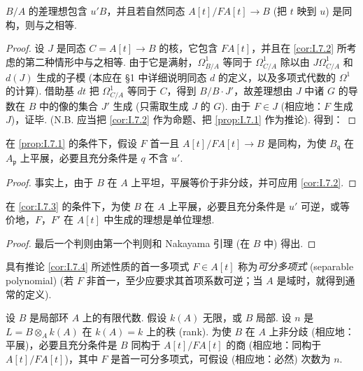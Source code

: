 \begin{corollary}\label{cor:I.7.2}
$B/A$ 的差理想包含 $u'B$，并且若自然同态 $A[t]/FA[t] \to B$ (把 $t$ 映到 $u$) 是同构，则与之相等.
\end{corollary}

\begin{proof}
设 $J$ 是同态 $C = A[t] \to B$ 的核，它包含 $FA[t]$，并且在 \ref{cor:I.7.2} 所考虑的第二种情形中与之相等. 由于它是满射，$\varOmega_{B/A}^{1}$ 等同于 $\varOmega_{C/A}^{1}$ 除以由 $J\varOmega_{C/A}^{1}$ 和 $d(J)$ 生成的子模 (本应在 §1 中详细说明同态 $d$ 的定义，以及多项式代数的 $\varOmega^{1}$ 的计算). 借助基 $dt$ 把 $\varOmega_{C/A}^{1}$ 等同于 $C$，得到 $B / B \cdot J'$，故差理想由 $J$ 中诸 $G$ 的导数在 $B$ 中的像的集合 $J'$ 生成 (只需取生成 $J$ 的 $G$). 由于 $F \in J$ (相应地：$F$ 生成 $J$)，证毕. (N.B. 应当把 \ref{cor:I.7.2} 作为命题、把 \ref{prop:I.7.1} 作为推论). 得到：
\end{proof}

\begin{corollary}\label{cor:I.7.3}
在 \ref{prop:I.7.1} 的条件下，假设 $F$ 首一且 $A[t]/FA[t] \to B$ 是同构，为使 $B_{\mathfrak{q}}$ 在 $A_{\mathfrak{p}}$ 上平展，必要且充分条件是 $q$ 不含 $u'$.
\end{corollary}

\begin{proof}
事实上，由于 $B$ 在 $A$ 上平坦，平展等价于非分歧，并可应用 \ref{cor:I.7.2}.
\end{proof}

\begin{corollary}\label{cor:I.7.4}
在 \ref{cor:I.7.3} 的条件下，为使 $B$ 在 $A$ 上平展，必要且充分条件是 $u'$ 可逆，或等价地，$F$，$F'$ 在 $A[t]$ 中生成的理想是单位理想.
\end{corollary}

\begin{proof}
最后一个判则由第一个判则和 Nakayama 引理 (在 $B$ 中) 得出.
\end{proof}

具有推论 \ref{cor:I.7.4} 所述性质的首一多项式 $F \in A[t]$ 称为\emph{可分多项式} (separable polynomial) (若 $F$ 非首一，至少应要求其首项系数可逆；当 $A$ 是域时，就得到通常的定义).

\begin{corollary}\label{cor:I.7.5}
设 $B$ 是局部环 $A$ 上的有限代数. 假设 $k(A)$ 无限，或 $B$ 局部. 设 $n$ 是 $L = B \otimes_A k(A)$ 在 $k(A) = k$ 上的秩 (rank). 为使 $B$ 在 $A$ 上非分歧 (相应地：平展)，必要且充分条件是 $B$ 同构于 $A[t]/FA[t]$ 的商 (相应地：同构于 $A[t]/FA[t]$)，其中 $F$ 是首一可分多项式，可假设 (相应地：必然) 次数为 $n$.
\end{corollary}

